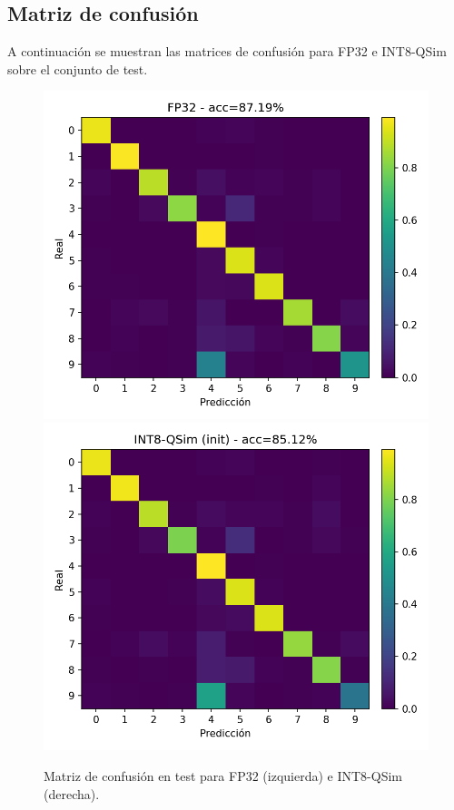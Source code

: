 \subsection*{Matriz de confusión}
A continuación se muestran las matrices de confusión para FP32 e INT8-QSim sobre el conjunto de test.

\begin{figure}[h]
\centering
\includegraphics[width=.45\linewidth]{../results/figuras/confusion_fp32.png}\hfill
\includegraphics[width=.45\linewidth]{../results/figuras/confusion_int8.png}
\caption{Matriz de confusión en test para FP32 (izquierda) e INT8-QSim (derecha).}
\end{figure}
